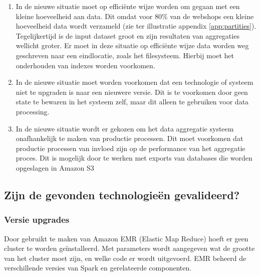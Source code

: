 \begin{enumerate}[label=(\alph*)]
    \item In de nieuwe situatie moet op efficiënte wijze worden om gegaan met een kleine hoeveelheid aan data. Dit omdat voor 80\% van de webshops een kleine hoeveelheid data wordt verzameld (zie ter illustratie appendix \ref{app:partities}). Tegelijkertijd is de input dataset groot en zijn resultaten van aggregaties wellicht groter. Er moet in deze situatie op efficiënte wijze data worden weg geschreven naar een eindlocatie,  zoals het filesysteem. Hierbij moet het onderhouden van indexes worden voorkomen.
    
    \item In de nieuwe situatie moet worden voorkomen dat een technologie of systeem niet te upgraden is naar een nieuwere versie. Dit is te voorkomen door geen state te bewaren in het systeem zelf, maar dit alleen te gebruiken voor data processing.
    
    \item In de nieuwe situatie wordt er gekozen om het data aggregatie systeem onafhankelijk te maken van productie processen. Dit moet voorkomen dat productie processen van invloed zijn op de performance van het aggregatie proces. Dit is mogelijk door te werken met exports van databases die worden opgeslagen in Amazon S3
\end{enumerate}

\clearpage


\subsection{Zijn de gevonden technologieën gevalideerd?}
\label{subsec:deelvraag3_vergelijking}

\subsubsection{\textbf{Versie upgrades}}

Door gebruikt te maken van Amazon EMR (Elastic Map Reduce) hoeft er geen cluster te worden geïnstalleerd. Met parameters wordt aangegeven wat de grootte van het cluster moet zijn, en welke code er wordt uitgevoerd. EMR beheerd de verschillende versies van Spark en gerelateerde componenten.

